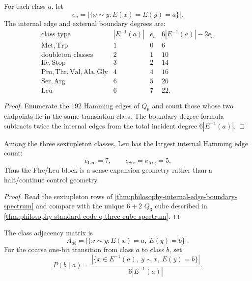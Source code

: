 \begin{theorem}
\label{thm:philosophy-internal-edge-boundary-spectrum}
For each class $a$, let
$$
  e_{a}=|\{x\sim y:E(x)=E(y)=a\}|.
$$
The internal edge and external boundary degrees are:
$$
\begin{array}{c|r|r|r}
  \text{class type} & |E^{-1}(a)| & e_{a}
    & 6|E^{-1}(a)|-2e_{a}\\
\hline
  \mathrm{Met},\mathrm{Trp} & 1 & 0 & 6\\
  \text{doubleton classes} & 2 & 1 & 10\\
  \mathrm{Ile},\mathrm{Stop} & 3 & 2 & 14\\
  \mathrm{Pro},\mathrm{Thr},\mathrm{Val},\mathrm{Ala},\mathrm{Gly}
    & 4 & 4 & 16\\
  \mathrm{Ser},\mathrm{Arg} & 6 & 5 & 26\\
  \mathrm{Leu} & 6 & 7 & 22.
\end{array}
$$
\end{theorem}
\begin{proof}
Enumerate the $192$ Hamming edges of $Q_{6}$ and count those whose two
endpoints lie in the same translation class. The boundary degree formula
subtracts twice the internal edges from the total incident degree
$6|E^{-1}(a)|$.
\end{proof}

\begin{corollary}
\label{cor:philosophy-leu-tight-sextupleton}
Among the three sextupleton classes, $\mathrm{Leu}$ has the largest
internal Hamming edge count:
$$
  e_{\mathrm{Leu}}=7,\qquad
  e_{\mathrm{Ser}}=e_{\mathrm{Arg}}=5.
$$
Thus the Phe/Leu block is a sense expansion geometry rather than a
halt/continue control geometry.
\end{corollary}
\begin{proof}
Read the sextupleton rows of
\autoref{thm:philosophy-internal-edge-boundary-spectrum} and compare
with the unique $6+2$ $Q_{3}$ cube described in
\autoref{thm:philosophy-standard-code-q-three-cube-spectrum}.
\end{proof}

\begin{definition}
\label{def:philosophy-class-adjacency-transition}
The class adjacency matrix is
$$
  A_{ab}=|\{x\sim y:E(x)=a,\ E(y)=b\}|.
$$
For the coarse one-bit transition from class $a$ to class $b$, set
$$
  P(b\mid a)
  =
  \frac{|\{x\in E^{-1}(a),\ y\sim x,\ E(y)=b\}|}
       {6|E^{-1}(a)|}.
$$
\end{definition}

